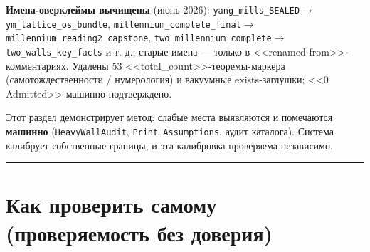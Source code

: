 \documentclass[11pt,a4paper]{article}
\begin{document}
\textbf{Имена-оверклеймы вычищены} (июнь 2026): \texttt{yang\_\allowbreak{}mills\_\allowbreak{}SEALED}$\to$\texttt{ym\_\allowbreak{}lattice\_\allowbreak{}os\_\allowbreak{}bundle}, \texttt{millennium\_\allowbreak{}complete\_\allowbreak{}final}$\to$\texttt{millennium\_\allowbreak{}reading2\_\allowbreak{}capstone}, \texttt{two\_\allowbreak{}millennium\_\allowbreak{}complete}$\to$\texttt{two\_\allowbreak{}walls\_\allowbreak{}key\_\allowbreak{}facts} и т. д.; старые имена --- только в <<renamed from>>-комментариях. Удалены 53 <<total\_count>>-теоремы-маркера (самотождественности / нумерология) и вакуумные exists-заглушки; <<0 Admitted>> машинно подтверждено.

Этот раздел демонстрирует метод: слабые места выявляются и помечаются \textbf{машинно} (\texttt{Heavy\allowbreak{}Wall\allowbreak{}Audit}, \texttt{Print Assumptions}, аудит каталога). Система калибрует собственные границы, и эта калибровка проверяема независимо.

\bigskip\hrule\bigskip

\section{Как проверить самому (проверяемость без доверия)}
\end{document}
